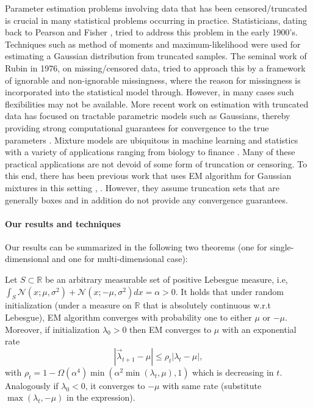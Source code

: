 Parameter estimation problems involving data that has been censored/truncated is crucial in many statistical problems occurring in practice. Statisticians, dating back to Pearson \cite{PA08} and Fisher \cite{F31}, tried to address this problem in the early 1900's. Techniques such as method of moments and maximum-likelihood were used for estimating a Gaussian distribution from truncated samples. The seminal work of Rubin \cite{R76} in 1976, on missing/censored data, tried to approach this by a framework of ignorable and non-ignorable missingness, where the reason for missingness is incorporated into the statistical model through. However, in many cases such flexibilities may not be available. More recent work on estimation with truncated data has focused on tractable parametric models such as Gaussians, thereby providing strong computational guarantees for convergence to the true parameters \cite{DGTZ18}.
Mixture models are ubiquitous in machine learning and statistics with a variety of applications ranging from biology \cite{BF08,APMP07} to finance \cite{BM02}. Many of these practical applications are not devoid of some form of truncation or censoring. To this end, there has been previous work that uses EM algorithm for Gaussian mixtures in this setting \cite{LS12}, \cite{MJ88}. However, they assume truncation sets that are generally boxes and in addition do not provide any convergence guarantees.

\paragraph{Our results and techniques}

Our results can be summarized in the following two theorems (one for single-dimensional and one for multi-dimensional case):

\begin{theorem}\label{thm:single} Let $S \subset \mathbb{R}$ be an arbitrary measurable set of positive Lebesgue measure, i.e, $\int_S \mathcal{N}(x;\mu, \sigma^2) + \mathcal{N}(x;-\mu, \sigma^2) dx = \alpha>0$. It holds that under random initialization (under a measure on $\mathbb{R}$ that is absolutely continuous w.r.t Lebesgue), EM algorithm converges with probability one to either $\mu$ or $-\mu$. Moreover, if initialization $\lambda_0>0$ then EM converges to $\mu$ with an exponential rate \[|\vec{\lambda}_{t+1}- \mu| \leq \rho_t |\lambda_t - \mu|,\] with $\rho_t = 1 - \Omega(\alpha^4)\min(\alpha^2\min(\lambda_t,\mu),1)$ which is decreasing in $t$. Analogously if $\lambda_0 < 0$, it converges to $-\mu$ with same rate (substitute $\max(\lambda_t,-\mu)$ in the expression).
\end{theorem}


